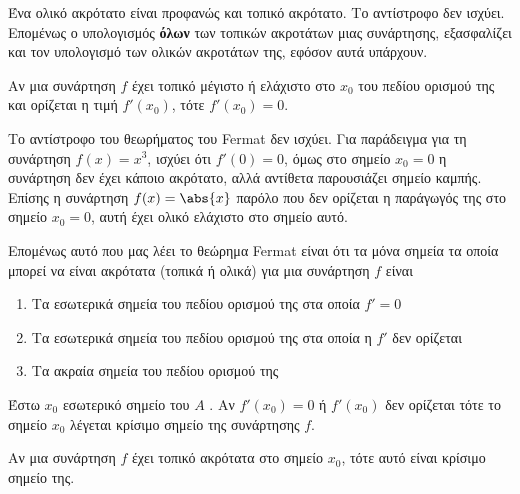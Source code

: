 \begin{rem}
    Ένα ολικό ακρότατο είναι προφανώς και τοπικό ακρότατο. Το αντίστροφο δεν ισχύει. Επομένως ο
    υπολογισμός \textbf{όλων} των τοπικών ακροτάτων μιας συνάρτησης, εξασφαλίζει και τον υπολογισμό
    των ολικών ακροτάτων της, εφόσον αυτά υπάρχουν.
\end{rem}

\begin{thm}[Fermat]
    Αν μια συνάρτηση $f$ έχει τοπικό μέγιστο ή ελάχιστο στο $ x_{0} $ του
    πεδίου ορισμού της και ορίζεται η τιμή $ f'(x_{0}) $, τότε $ f'(x_{0}) = 0 $.
\end{thm}

\begin{rem}
    Το αντίστροφο του θεωρήματος του Fermat δεν ισχύει. Για παράδειγμα για τη συνάρτηση
    $ f(x)=x^{3} $, ισχύει ότι $ f'(0)=0 $, όμως στο σημείο $ x_{0} = 0 $ η συνάρτηση δεν έχει
    κάποιο ακρότατο, αλλά αντίθετα παρουσιάζει σημείο καμπής. Επίσης η συνάρτηση $ f(x) = \abs{x} $
    παρόλο που δεν ορίζεται η παράγωγός της στο σημείο $ x_{0} = 0 $, αυτή έχει ολικό ελάχιστο στο
    σημείο αυτό.
\end{rem}

\begin{rem}
    Επομένως αυτό που μας λέει το θεώρημα Fermat είναι ότι τα μόνα σημεία τα οποία
    μπορεί να είναι ακρότατα (τοπικά ή ολικά) για μια συνάρτηση $f$ είναι 

    \begin{enumerate}
        \item Τα εσωτερικά σημεία του πεδίου ορισμού της στα οποία $ f'=0 $
        \item Τα εσωτερικά σημεία του πεδίου ορισμού της στα οποία η $ f' $ δεν ορίζεται
        \item Τα ακραία σημεία του πεδίου ορισμού της
    \end{enumerate}
\end{rem}


\begin{dfn}
    Έστω $ x_{0} $ εσωτερικό σημείο του $A$ . Αν $ f'(x_{0}) = 0 $ ή $ f'(x_{0}) $ δεν ορίζεται τότε
    το σημείο $ x_{0} $ λέγεται \textcolor{Col1}{κρίσιμο} σημείο της συνάρτησης $f$. 
\end{dfn}




    \begin{prop}
        Αν μια συνάρτηση $f$ έχει τοπικό ακρότατα στο σημείο $ x_{0} $, τότε αυτό είναι κρίσιμο
        σημείο της.
    \end{prop}

